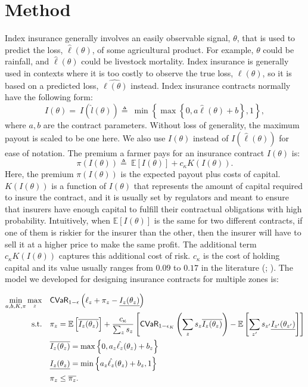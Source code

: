 \documentclass[12pt]{article}
\begin{document}
\section{Method}
Index insurance generally involves an easily observable signal, $\theta$, that is used to predict the loss, $\hat{\ell}(\theta)$, of some agricultural product. For example, $\theta$ could be rainfall, and $\hat{\ell}(\theta)$ could be livestock mortality. Index insurance is generally used in contexts where it is too costly to observe the true loss, $\ell(\theta)$, so it is based on a predicted loss, $\hat{\ell(\theta)}$ instead. Index insurance contracts normally have the following form: 
\begin{equation}
   I(\theta)=\ I(\hat{l}(\theta)) \triangleq\ \min \left \{\max \left \{0,a\hat{\ell}(\theta) + b \right \}, 1 \right \}, 
\end{equation}
where $a,b$ are the contract parameters. Without loss of generality, the maximum payout is scaled to be one here. We also use $I(\theta)$ instead of $I(\hat{\ell}(\theta))$ for ease of notation. The premium a farmer pays for an insurance contract $I(\theta)$ is:%
\begin{equation}\label{eq-02}
   \pi(I(\theta)) \triangleq\ \mathbb{E}[I(\theta)] + c_{\kappa} K(I(\theta)).
\end{equation}
Here, the premium $\pi(I(\theta))$ is the expected payout plus costs of capital. $K(I(\theta))$ is a function of $I(\theta)$ that represents the amount of capital required to insure the contract, and it is usually set by regulators and meant to ensure that insurers have enough capital to fulfill their contractual obligations with high probability. Intuitively, when $\mathbb{E}[I(\theta)]$ is the same for two different contracts, if one of them is riskier for the insurer than the other, then the insurer will have to sell it at a higher price to make the same profit. The additional term $c_{\kappa} K(I(\theta))$ captures this additional cost of risk. $c_{\kappa}$ is the cost of holding capital and its value usually ranges from $0.09$ to $0.17$ in the literature (\cite{kielholz2000cost}; \cite{barinov2020estimating}). The model we developed for designing insurance contracts for multiple zones is: 

\begin{align}
    \min_{a,b,K,\pi} \max_z &\quad {\sf CVaR}_{1-\epsilon}\left (\ell_z  + \pi_z - \underline{I_z(\theta_z)} \right )\label{eq-33}\\
    \text{s.t.} &\quad \pi_z  = \mathbb{E}\left [ \overline{I_z(\theta_z)} \right ] + \frac{c_{\kappa}}{\sum_z s_z}  \left [ {\sf CVaR}_{1-\epsilon_K} \left ( \sum_z s_z\overline{I_z(\theta_z)} \right ) - \mathbb{E}\left [ \sum_{z'} s_{z'}\underline{I_{z'}(\theta_{z'})} \right ] \right ] \label{eq-32}\\
    &\quad \overline{I_z(\theta_z)} = \max \left \{0,a_z\hat{\ell_z}(\theta_z) + b_z \right \} \nonumber\\
    &\quad\underline{I_z(\theta_z)} = \min \left \{a_z\hat{\ell_z}(\theta_z)+b_z,1 \right \} \nonumber\\
    &\quad\pi_z \leq \overline{\pi_z} \nonumber.
  \end{align}
\end{document}
